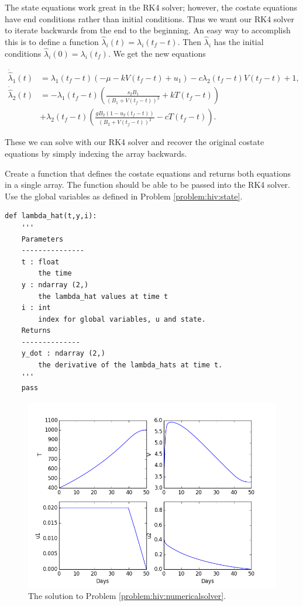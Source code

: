 The state equations work great in the RK4 solver; however, the costate equations have end conditions rather than initial conditions. Thus we want our RK4 solver to iterate backwards from the end to the beginning. An easy way to accomplish this is to define a function $ \hat{\lambda}_i(t)=\lambda_i(t_f - t).$ Then $\hat{\lambda}_i$ has the initial conditions $\hat{\lambda}_i(0) = \lambda_i(t_f)$. We get the new equations

\begin{align*}
\dot{\hat{\lambda}}_1(t) &=\lambda_1(t_f-t)\left(-\mu - kV(t_f-t) + u_{1}\right) - c\lambda_2(t_f-t)V(t_f-t) + 1, \\
\dot{\hat{\lambda}}_2(t) &= -\lambda_1(t_f-t)\left(\frac{s_2B_1}{(B_1+V(t_f-t))^2}+kT(t_f-t)\right) \\
&+ \lambda_2(t_f-t)\left(\frac{gB_2(1-u_2(t_f-t))}{(B_2 + V(t_f-t))^2} - cT(t_f-t)\right).
\end{align*}

These we can solve with our RK4 solver and recover the original costate equations by simply indexing the array backwards.

\begin{problem}
Create a function that defines the costate equations and returns both equations in a single array. The function should be able to be passed into the RK4 solver. Use the global variables as defined in Problem \ref{problem:hiv:state}.

\begin{lstlisting}
def lambda_hat(t,y,i):
	'''
	Parameters
	---------------
	t : float
		the time
	y : ndarray (2,)
		the lambda_hat values at time t
	i : int
		index for global variables, u and state.
	Returns
	--------------
	y_dot : ndarray (2,)
		the derivative of the lambda_hats at time t.
	'''
	pass
\end{lstlisting}

\label{problem:hiv:costateequations}
\end{problem}


\begin{figure}
\centering
\includegraphics[width=5in]{solutions.png}
\caption{The solution to Problem \ref{problem:hiv:numericalsolver}.}
\label{fig:hiv:solutions}
\end{figure}



